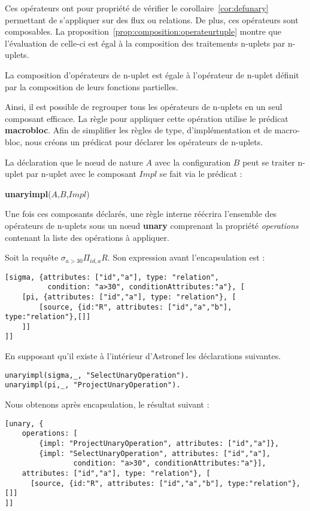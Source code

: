 Ces opérateurs ont pour propriété de vérifier le corollaire~\ref{cor:defunary} permettant de s'appliquer sur des flux ou relations. De plus, ces opérateurs sont composables. La proposition~\ref{prop:composition:operateurtuple} montre que l'évaluation de celle-ci est égal à la composition des traitements n-uplets par n-uplets.
\begin{prop}\label{prop:composition:operateurtuple}
    La composition d'opérateurs de n-uplet est égale à l'opérateur de n-uplet définit par la composition de leurs fonctions partielles.
\end{prop}

Ainsi, il est possible de regrouper tous les opérateurs de n-uplets en un seul composant efficace. La règle pour appliquer cette opération utilise le prédicat \textbf{macrobloc}. Afin de simplifier les règles de type, d'implémentation et de macro-bloc, nous créons un prédicat pour déclarer les opérateurs de n-uplets.
\begin{regle}
La déclaration que le nœud de nature $A$ avec la configuration $B$ peut se traiter n-uplet par n-uplet avec le composant $Impl$ se fait via le prédicat :
\begin{center}\textbf{unaryimpl}($A$,$B$,$Impl$)\end{center}
\end{regle}

Une fois ces composants déclarés, une règle interne réécrira l'ensemble des opérateurs de n-uplets sous un nœud \textbf{unary} comprenant la propriété \textit{operations} contenant la liste des opérations à appliquer.
\begin{example}
Soit la requête $\sigma_{a > 30}\Pi_{id,a} R$. Son expression avant l'encapsulation est :
\begin{lstlisting}
[sigma, {attributes: ["id","a"], type: "relation", 
		  condition: "a>30", conditionAttributes:"a"}, [
	[pi, {attributes: ["id","a"], type: "relation"}, [
		[source, {id:"R", attributes: ["id","a","b"], type:"relation"},[]]
	]]
]]
\end{lstlisting}

En supposant qu'il existe à l'intérieur d'Astronef les déclarations suivantes.
\begin{lstlisting}
unaryimpl(sigma,_, "SelectUnaryOperation").
unaryimpl(pi,_, "ProjectUnaryOperation").
\end{lstlisting}

Nous obtenons après encapsulation, le résultat suivant :
\begin{lstlisting}
[unary, {
	operations: [
		{impl: "ProjectUnaryOperation", attributes: ["id","a"]},
		{impl: "SelectUnaryOperation", attributes: ["id","a"], 
				condition: "a>30", conditionAttributes:"a"}], 
	attributes: ["id","a"], type: "relation"}, [
	  [source, {id:"R", attributes: ["id","a","b"], type:"relation"},[]]
]]
\end{lstlisting}
\end{example}


